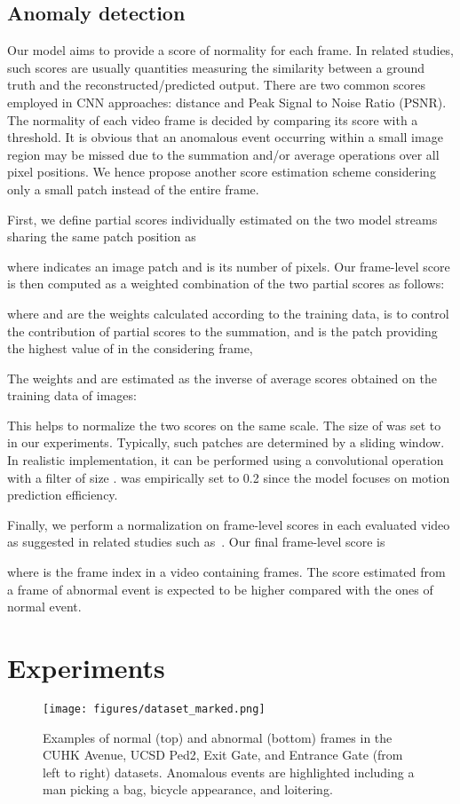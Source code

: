 \documentclass[10pt,twocolumn,letterpaper]{article}
\begin{document}
\subsection{Anomaly detection}\label{sec:detection}
Our model aims to provide a score of normality for each frame. In related studies, such scores are usually quantities measuring the similarity between a ground truth and the reconstructed/predicted output. There are two common scores employed in CNN approaches:  distance and Peak Signal to Noise Ratio (PSNR). The normality of each video frame is decided by comparing its score with a threshold. It is obvious that an anomalous event occurring within a small image region may be missed due to the summation and/or average operations over all pixel positions. We hence propose another score estimation scheme considering only a small patch instead of the entire frame.

First, we define partial scores individually estimated on the two model streams sharing the same patch position as

where  indicates an image patch and  is its number of pixels. Our frame-level score is then computed as a weighted combination of the two partial scores as follows:

where  and  are the weights calculated according to the training data,  is to control the contribution of partial scores to the summation, and  is the patch providing the highest value of  in the considering frame, \ie

The weights  and  are estimated as the inverse of average scores obtained on the training data of  images:

This helps to normalize the two scores on the same scale. The size of  was set to  in our experiments. Typically, such patches are determined by a sliding window. In realistic implementation, it can be performed using a convolutional operation with a filter of size .  was empirically set to 0.2 since the model focuses on motion prediction efficiency.

Finally, we perform a normalization on frame-level scores in each evaluated video as suggested in related studies such as~\cite{Hasan2016Learning,Ravanbakhsh2017Abnormal,Wen2018Future}. Our final frame-level score is

where  is the frame index in a video containing  frames. The score estimated from a frame of abnormal event is expected to be higher compared with the ones of normal event.

\section{Experiments}\label{sec:experiment}
\begin{figure}\begin{center}
\texttt{[image: figures/dataset\_marked.png]}
\end{center}
\caption{Examples of normal (top) and abnormal (bottom) frames in the CUHK Avenue, UCSD Ped2, Exit Gate, and Entrance Gate (from left to right) datasets. Anomalous events are highlighted including a man picking a bag, bicycle appearance, and loitering.}
\label{fig:dataset}
\end{figure}
\end{document}
